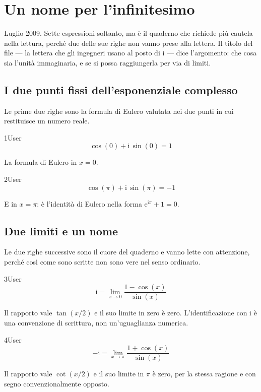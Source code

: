 \chapter{Un nome per l'infinitesimo}
\label{cap:j}

Luglio 2009. Sette espressioni soltanto, ma è il quaderno che richiede più cautela nella lettura, perché due delle sue righe non vanno prese alla lettera. Il titolo del file — la lettera che gli ingegneri usano al posto di $\mathrm{i}$ — dice l'argomento: che cosa sia l'unità immaginaria, e se si possa raggiungerla per via di limiti.

\section{I due punti fissi dell'esponenziale complesso}

Le prime due righe sono la formula di Eulero valutata nei due punti in cui restituisce un numero reale.

\begin{espr}{1}{User}{\verificata}
\[
\cos\!\left(0\right) + \mathrm{i}\, \sin\!\left(0\right) = 1
\]
\end{espr}
La formula di Eulero in $x=0$.

\begin{espr}{2}{User}{\verificata}
\[
\cos\!\left(\pi\right) + \mathrm{i}\, \sin\!\left(\pi\right) = -1
\]
\end{espr}
E in $x=\pi$: è l'identità di Eulero nella forma $\mathrm{e}^{\mathrm{i}\pi}+1=0$.

\section{Due limiti e un nome}

Le due righe successive sono il cuore del quaderno e vanno lette con attenzione, perché così come sono scritte non sono vere nel senso ordinario.

\begin{espr}{3}{User}{}
\[
\mathrm{i} = \lim_{x \to 0} \frac{1 - \cos\!\left(x\right)}{\sin\!\left(x\right)}
\]
\end{espr}
Il rapporto vale $\tan(x/2)$ e il suo limite in zero è zero. L'identificazione con $\mathrm{i}$ è una convenzione di scrittura, non un'uguaglianza numerica.

\begin{espr}{4}{User}{}
\[
-\mathrm{i} = \lim_{x \to \pi} \frac{1 + \cos\!\left(x\right)}{\sin\!\left(x\right)}
\]
\end{espr}
Il rapporto vale $\cot(x/2)$ e il suo limite in $\pi$ è zero, per la stessa ragione e con segno convenzionalmente opposto.

